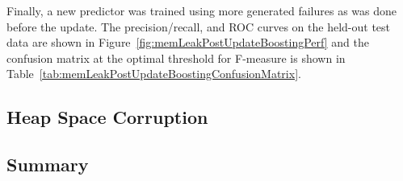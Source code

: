 \figMemLeakPostUpdateSameBoostedModel
\tabMemLeakPostUpdateBoostingSameModelConfusionMatrix

Finally, a new predictor was trained using more generated failures as was done
before the update.  The precision/recall, and \ac{ROC} curves on the held-out
test data are shown in Figure~\ref{fig:memLeakPostUpdateBoostingPerf} and the
confusion matrix at the optimal threshold for F-measure is shown in
Table~\ref{tab:memLeakPostUpdateBoostingConfusionMatrix}.

\figMemLeakPostUpdateBoostingPerf
\tabMemLeakPostUpdateBoostingConfusionMatrix

\subsection{Heap Space Corruption}

\subsection{Summary}

